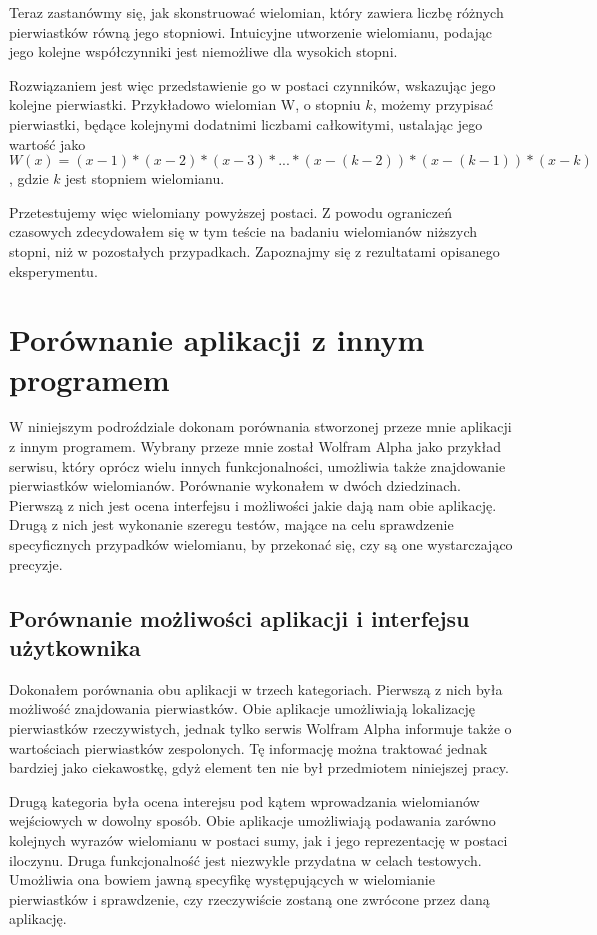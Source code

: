 \documentclass[oneside,a4paper]{book}
\begin{document}
	Teraz zastanówmy się, jak skonstruować wielomian, który zawiera liczbę różnych pierwiastków równą jego stopniowi. Intuicyjne utworzenie wielomianu, podając jego kolejne współczynniki jest niemożliwe dla wysokich stopni.
	
	Rozwiązaniem jest więc przedstawienie go w postaci czynników, wskazując jego kolejne pierwiastki. Przykładowo wielomian W, o stopniu $k$, możemy przypisać pierwiastki, będące kolejnymi dodatnimi liczbami całkowitymi, ustalając jego wartość jako $W(x)=(x-1)*(x-2)*(x-3)*...*(x-(k-2))*(x-(k-1))*(x-k)$, gdzie $k$ jest stopniem wielomianu.
	
	Przetestujemy więc wielomiany powyższej postaci. Z powodu ograniczeń czasowych zdecydowałem się w tym teście na badaniu wielomianów niższych stopni, niż w pozostałych przypadkach. Zapoznajmy się z rezultatami opisanego eksperymentu.
	
	\section {Porównanie aplikacji z innym programem}
	
	W niniejszym podroździale dokonam porównania stworzonej przeze mnie aplikacji z innym programem. Wybrany przeze mnie został Wolfram Alpha jako przykład serwisu, który oprócz wielu innych funkcjonalności, umożliwia także znajdowanie pierwiastków wielomianów. Porównanie wykonałem w dwóch dziedzinach. Pierwszą z nich jest ocena interfejsu i możliwości jakie dają nam obie aplikację. Drugą z nich jest wykonanie szeregu testów, mające na celu sprawdzenie specyficznych przypadków wielomianu, by przekonać się, czy są one wystarczająco precyzje.
	
	\subsection {Porównanie możliwości aplikacji i interfejsu użytkownika}
	
	Dokonałem porównania obu aplikacji w trzech kategoriach. Pierwszą z nich była możliwość znajdowania pierwiastków. Obie aplikacje umożliwiają lokalizację pierwiastków rzeczywistych, jednak tylko serwis Wolfram Alpha informuje także o wartościach pierwiastków zespolonych. Tę informację można traktować jednak bardziej jako ciekawostkę, gdyż element ten nie był przedmiotem niniejszej pracy.
	
	Drugą kategoria była ocena interejsu pod kątem wprowadzania wielomianów wejściowych w dowolny sposób. Obie aplikacje umożliwiają podawania zarówno kolejnych wyrazów wielomianu w postaci sumy, jak i jego reprezentację w postaci iloczynu. Druga funkcjonalność jest niezwykle przydatna w celach testowych. Umożliwia ona bowiem jawną specyfikę występujących w wielomianie pierwiastków i sprawdzenie, czy rzeczywiście zostaną one zwrócone przez daną aplikację.
	
\end{document}
